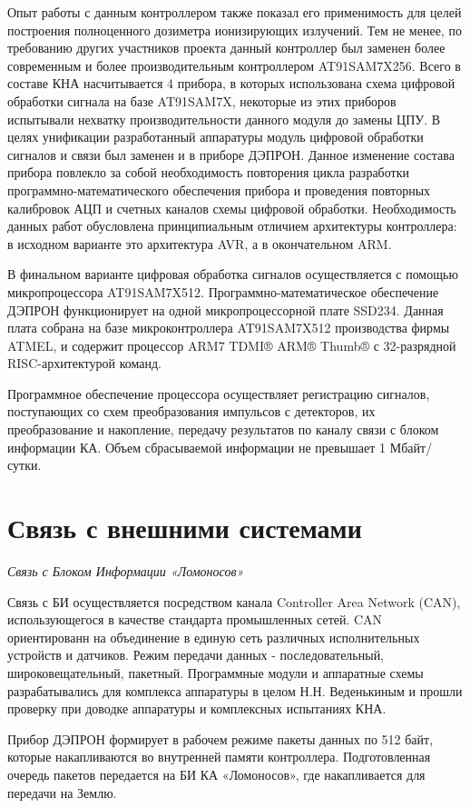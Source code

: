 Опыт работы с данным контроллером также показал его применимость для целей построения полноценного дозиметра ионизирующих излучений. Тем не менее, по требованию других участников проекта данный контроллер был заменен более современным и более производительным контроллером AT91SAM7X256. Всего в составе КНА насчитывается 4 прибора, в которых использована схема цифровой обработки сигнала на базе AT91SAM7X, некоторые из этих приборов испытывали нехватку производительности данного модуля до замены ЦПУ. В целях унификации разработанный аппаратуры модуль цифровой обработки сигналов и связи был заменен и в приборе ДЭПРОН. Данное изменение состава прибора повлекло за собой необходимость повторения цикла разработки программно-математического обеспечения прибора и проведения повторных калибровок АЦП и счетных каналов схемы цифровой обработки. Необходимость данных работ обусловлена принципиальным отличием архитектуры контроллера: в исходном варианте это архитектура AVR, а в окончательном ARM. 

В финальном варианте цифровая обработка сигналов осуществляется с помощью микропроцессора AT91SAM7X512. Программно-математическое обеспечение ДЭПРОН функционирует на одной микропроцессорной плате SSD234. Данная плата собрана на базе микроконтроллера AT91SAM7X512 производства фирмы ATMEL, и содержит процессор ARM7 TDMI® ARM® Thumb® с 32-разрядной RISC-архитектурой команд.

Программное обеспечение процессора осуществляет регистрацию сигналов, поступающих со схем преобразования импульсов с детекторов, их преобразование и накопление, передачу результатов по каналу связи с блоком информации КА. Объем сбрасываемой информации не превышает 1 Мбайт/сутки.

\section{Связь с внешними системами}
\emph{Связь с Блоком Информации «Ломоносов»}

Связь с БИ осуществляется посредством канала Controller Area Network (CAN), использующегося в качестве стандарта промышленных сетей. CAN ориентированн на объединение в единую сеть различных исполнительных устройств и датчиков. Режим передачи данных - последовательный, широковещательный, пакетный. Программные модули и аппаратные схемы разрабатывались для комплекса аппаратуры в целом Н.Н. Веденькиным и прошли проверку при доводке аппаратуры и комплексных испытаниях КНА.

Прибор ДЭПРОН формирует в рабочем режиме пакеты данных по 512 байт, которые накапливаются во внутренней памяти контроллера. Подготовленная очередь пакетов  передается на БИ КА «Ломоносов», где накапливается для передачи на Землю.

